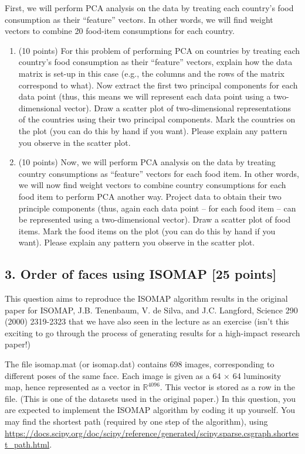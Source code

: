 \documentclass[twoside,10pt]{article}
\begin{document}
\vspace{.1in}
First, we will perform PCA analysis on the data by treating each country's food consumption as their ``feature'' vectors. In other words, we will find weight vectors to combine 20 food-item consumptions for each country.  
 
\begin{enumerate}

\item (10 points) For this problem of performing PCA on countries by treating each country's food consumption as their ``feature'' vectors, explain how the data matrix is set-up in this case (e.g., the columns and the rows of the matrix correspond to what). Now extract the first two principal components for each data point (thus, this means we will represent each data point using a two-dimensional vector). Draw a scatter plot of two-dimensional representations of the countries using their two principal components. Mark the countries on the plot (you can do this by hand if you want). Please explain any pattern you observe in the scatter plot.

\item (10 points) Now, we will perform PCA analysis on the data by treating country consumptions as ``feature'' vectors for each food item. In other words, we will now find weight vectors to combine country consumptions for each food item to perform PCA another way. Project data to obtain their two principle components (thus, again each data point -- for each food item -- can be represented using a two-dimensional vector). Draw a scatter plot of food items. Mark the food items on the plot (you can do this by hand if you want). Please explain any pattern you observe in the scatter plot.
\end{enumerate}


\clearpage

\subsection*{3. Order of faces using ISOMAP [25 points]}

This question aims to reproduce the ISOMAP algorithm results in the original paper for ISOMAP, J.B. Tenenbaum, V. de Silva, and J.C. Langford, Science 290 (2000) 2319-2323 that we have also seen in the lecture as an exercise (isn't this exciting to go through the process of generating results for a high-impact research paper!) 


The file \textsf{isomap.mat} (or \textsf{isomap.dat}) contains 698 images, corresponding to different poses of the same face. Each image is given as a 64 $\times$ 64 luminosity map, hence represented as a vector in $\mathbb R^{4096}$. This vector is stored as a row in the file. (This is one of the datasets used in the original paper.) In this question, you are expected to implement the ISOMAP algorithm by coding it up yourself. You may find the shortest path (required by one step of the algorithm), using \url{https://docs.scipy.org/doc/scipy/reference/generated/scipy.sparse.csgraph.shortest_path.html}. 
\end{document}
